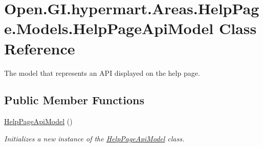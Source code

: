 \hypertarget{class_open_1_1_g_i_1_1hypermart_1_1_areas_1_1_help_page_1_1_models_1_1_help_page_api_model}{}\section{Open.\+G\+I.\+hypermart.\+Areas.\+Help\+Page.\+Models.\+Help\+Page\+Api\+Model Class Reference}
\label{class_open_1_1_g_i_1_1hypermart_1_1_areas_1_1_help_page_1_1_models_1_1_help_page_api_model}


The model that represents an A\+PI displayed on the help page.  


\subsection*{Public Member Functions}
\begin{DoxyCompactItemize}
\item 
\hyperlink{class_open_1_1_g_i_1_1hypermart_1_1_areas_1_1_help_page_1_1_models_1_1_help_page_api_model_a34aa95dfea87b53bcfac8601fb1f3b93}{Help\+Page\+Api\+Model} ()
\begin{DoxyCompactList}\small\item\em Initializes a new instance of the \hyperlink{class_open_1_1_g_i_1_1hypermart_1_1_areas_1_1_help_page_1_1_models_1_1_help_page_api_model}{Help\+Page\+Api\+Model} class. \end{DoxyCompactList}\end{DoxyCompactItemize}
